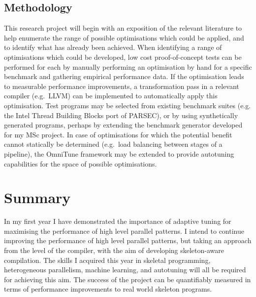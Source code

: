 \documentclass[11pt]{article}
\begin{document}
  \subsection{Methodology}

  This research project will begin with an exposition of the relevant
  literature to help enumerate the range of possible optimisations which
  could be applied, and to identify what has already been achieved.
  When identifying a range of optimisations which could be developed,
  low cost proof-of-concept tests can be performed for each by manually
  performing an optimisation by hand for a specific benchmark and
  gathering empirical performance data. If the optimisation leads to
  measurable performance improvements, a transformation pass in a
  relevant compiler (e.g.\ LLVM) can be implemented to automatically
  apply this optimisation. Test programs may be selected from existing
  benchmark suites (e.g. the Intel Thread Building Blocks port of
  PARSEC), or by using synthetically generated programs, perhaps by
  extending the benchmark generator developed for my MSc project. In
  case of optimisations for which the potential benefit cannot
  statically be determined (e.g.\ load balancing between stages of a
  pipeline), the OmniTune framework may be extended to provide
  autotuning capabilities for the space of possible optimisations.


  \section{Summary}

  In my first year I have demonstrated the importance of adaptive tuning
  for maximising the performance of high level parallel patterns. I
  intend to continue improving the performance of high level parallel
  patterns, but taking an approach from the level of the compiler, with
  the aim of developing skeleton-aware compilation. The skills I
  acquired this year in skeletal programming, heterogeneous parallelism,
  machine learning, and autotuning will all be required for achieving
  this aim. The success of the project can be quantifiably measured in
  terms of performance improvements to real world skeleton programs.


  \label{bibliography}
  \printbibliography
\end{document}
